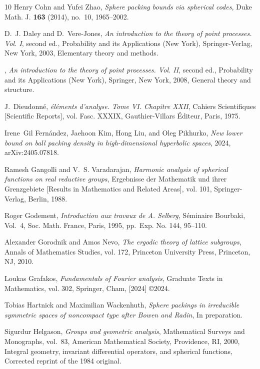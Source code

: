 \documentclass[12pt,reqno,a4paper]{amsart}
\theoremstyle{theorem}
\theoremstyle{definition}
\numberwithin{theorem}{section}
\numberwithin{equation}{section}
\begin{document}
\begin{thebibliography}{10}
Henry Cohn and Yufei Zhao, \emph{Sphere packing bounds via spherical codes},
  Duke Math. J. \textbf{163} (2014), no.~10, 1965--2002. 

D.~J. Daley and D.~Vere-Jones, \emph{An introduction to the theory of point
  processes. {V}ol. {I}}, second ed., Probability and its Applications (New
  York), Springer-Verlag, New York, 2003, Elementary theory and methods.

\bysame, \emph{An introduction to the theory of point processes. {V}ol. {II}},
  second ed., Probability and its Applications (New York), Springer, New York,
  2008, General theory and structure. 

J.~Dieudonn\'e, \emph{\'el\'ements d'analyse. {T}ome {VI}. {C}hapitre {XXII}},
  Cahiers Scientifiques [Scientific Reports], vol. Fasc. XXXIX,
  Gauthier-Villars \'Editeur, Paris, 1975. 

Irene~Gil Fernández, Jaehoon Kim, Hong Liu, and Oleg Pikhurko, \emph{New lower
  bound on ball packing density in high-dimensional hyperbolic spaces}, 2024,
  arXiv:2405.07818.

Ramesh Gangolli and V.~S. Varadarajan, \emph{Harmonic analysis of spherical
  functions on real reductive groups}, Ergebnisse der Mathematik und ihrer
  Grenzgebiete [Results in Mathematics and Related Areas], vol. 101,
  Springer-Verlag, Berlin, 1988. 

Roger Godement, \emph{Introduction aux travaux de {A}. {S}elberg}, S\'eminaire
  {B}ourbaki, {V}ol.\ 4, Soc. Math. France, Paris, 1995, pp.~Exp. No. 144,
  95--110. 

Alexander Gorodnik and Amos Nevo, \emph{The ergodic theory of lattice
  subgroups}, Annals of Mathematics Studies, vol. 172, Princeton University
  Press, Princeton, NJ, 2010. 

Loukas Grafakos, \emph{Fundamentals of {F}ourier analysis}, Graduate Texts in
  Mathematics, vol. 302, Springer, Cham, [2024] \copyright 2024. 

Tobias Hartnick and Maximilian Wackenhuth, \emph{Sphere packings in irreducible
  symmetric spaces of noncompact type after {B}owen and {R}adin}, In
  preparation.

Sigurdur Helgason, \emph{Groups and geometric analysis}, Mathematical Surveys
  and Monographs, vol.~83, American Mathematical Society, Providence, RI, 2000,
  Integral geometry, invariant differential operators, and spherical functions,
  Corrected reprint of the 1984 original. 


\end{thebibliography}
\end{document}
